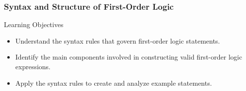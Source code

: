 \documentclass[aspectratio=169]{beamer}
\begin{document}
\begin{frame}[fragile]
    \frametitle{Syntax and Structure of First-Order Logic}
    \begin{block}{Learning Objectives}
        \begin{itemize}
            \item Understand the syntax rules that govern first-order logic statements.
            \item Identify the main components involved in constructing valid first-order logic expressions.
            \item Apply the syntax rules to create and analyze example statements.
        \end{itemize}
    \end{block}
\end{frame}
\end{document}
